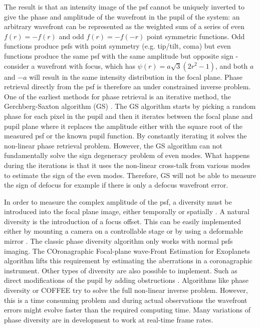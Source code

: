 \documentclass[letterpaper]{ar-1col}
\begin{document}
The result is that an intensity image of the \ac{psf} cannot be uniquely inverted to give the phase and amplitude of the wavefront in the pupil of the system: an arbitrary wavefront can be represented as the weighted sum of a series of even $f(r)=-f(r)$ and odd $f(r)=-f(-r)$ point symmetric functions.
%
Odd functions produce \acp{psf} with point symmetry (e.g. tip/tilt, coma) but even functions produce the same \ac{psf} with the same amplitude but opposite sign - consider a wavefront with focus, which has $\psi(r) = a\sqrt{3}(2r^2-1)$, and both $a$ and $-a$ will result in the same intensity distribution in the focal plane.
%
Phase retrieval directly from the \ac{psf} is therefore an under constrained inverse problem. One of the earliest methods for phase retrieval is an iterative method, the Gerchberg-Saxton algorithm (GS) \citep{Gerchberg72}. The GS algorithm starts by picking a random phase for each pixel in the pupil and then it iterates between the focal plane and pupil plane where it replaces the amplitude either with the square root of the measured \ac{psf} or the known  pupil function. By constantly iterating it solves the non-linear phase retrieval problem. However, the GS algorithm can not fundamentally solve the sign degeneracy problem of even modes. What happens during the iterations is that it uses the non-linear cross-talk from various modes to estimate the sign of the even modes. Therefore, GS will not be able to measure the sign of defocus for example if there is only a defocus wavefront error.

In order to measure the complex amplitude of the \ac{psf}, a diversity must be introduced into the focal plane image, either temporally or spatially \citep[see ][ for a review of these]{Fienup13,Gonsalves14}. A natural diversity is the introduction of a focus offset. This can be easily implemented either by mounting a camera on a controllable stage or by using a deformable mirror \citep{VanGorkom21DMs}. The classic phase diversity algorithm only works with normal \acp{psf} imaging. The COronagraphic Focal-plane wave-Front Estimation for Exoplanets \citep[COFFEE ;][]{Sauvage12,Paul13, herscovici2018experimental} algorithm lifts this requirement by estimating the aberrations in a coronagraphic instrument. Other types of diversity are also possible to implement. Such as direct modifications of the pupil by adding obstructions \citep{martinache2013asymmetric, brooks2016polarization, bos2019focal, gerard2023high}. %
%
Algorithms like phase diversity or COFFEE try to solve the full non-linear inverse problem. However, this is a time consuming problem and during actual observations the wavefront errors might evolve faster than the required computing time. Many variations of phase diversity are in development to work at real-time frame rates. 
\end{document}
